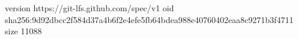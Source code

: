 version https://git-lfs.github.com/spec/v1
oid sha256:9d92dbcc2f584d37a4b6f2e4efe5fb64bdea988e40760402eaa8c9271b3f4711
size 11088
